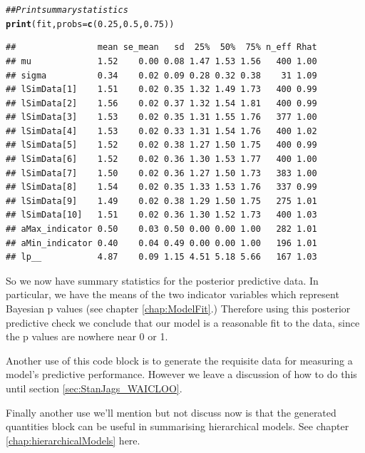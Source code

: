 \documentclass[11pt,fullpage]{book}
\makeatletter
\newenvironment{kframe}{%
	\def\at@end@of@kframe{}%
	\ifinner\ifhmode%
	\def\at@end@of@kframe{\end{minipage}}%
\begin{minipage}{\columnwidth}%
	\fi\fi%
	\def\FrameCommand##1{\hskip\@totalleftmargin \hskip-\fboxsep
		\colorbox{shadecolor}{##1}\hskip-\fboxsep
		\hskip-\linewidth \hskip-\@totalleftmargin \hskip\columnwidth}%
	\MakeFramed {\advance\hsize-\width
		\@totalleftmargin\z@ \linewidth\hsize
		\@setminipage}}%
{\par\unskip\endMakeFramed%
	\at@end@of@kframe}
\newcommand{\hlnum}[1]{\textcolor[rgb]{0.686,0.059,0.569}{#1}}%
\newcommand{\hlcom}[1]{\textcolor[rgb]{0.678,0.584,0.686}{\textit{#1}}}%
\newcommand{\hlstd}[1]{\textcolor[rgb]{0.345,0.345,0.345}{#1}}%
\newcommand{\hlkwc}[1]{\textcolor[rgb]{0.333,0.667,0.333}{#1}}%
\newcommand{\hlkwd}[1]{\textcolor[rgb]{0.737,0.353,0.396}{\textbf{#1}}}%
\newenvironment{knitrout}{}{} %
\makeatother
\begin{document}
\begin{knitrout}\small
		\color{fgcolor}\begin{kframe}
			\begin{alltt}
				\hlcom{## Print summary statistics}
				\hlkwd{print}\hlstd{(fit,}\hlkwc{probs} \hlstd{=} \hlkwd{c}\hlstd{(}\hlnum{0.25}\hlstd{,} \hlnum{0.5}\hlstd{,} \hlnum{0.75}\hlstd{))}
			\end{alltt}
			\begin{verbatim}
##                mean se_mean   sd  25%  50%  75% n_eff Rhat
## mu             1.52    0.00 0.08 1.47 1.53 1.56   400 1.00
## sigma          0.34    0.02 0.09 0.28 0.32 0.38    31 1.09
## lSimData[1]    1.51    0.02 0.35 1.32 1.49 1.73   400 0.99
## lSimData[2]    1.56    0.02 0.37 1.32 1.54 1.81   400 0.99
## lSimData[3]    1.53    0.02 0.35 1.31 1.55 1.76   377 1.00
## lSimData[4]    1.53    0.02 0.33 1.31 1.54 1.76   400 1.02
## lSimData[5]    1.52    0.02 0.38 1.27 1.50 1.75   400 0.99
## lSimData[6]    1.52    0.02 0.36 1.30 1.53 1.77   400 1.00
## lSimData[7]    1.50    0.02 0.36 1.27 1.50 1.73   383 1.00
## lSimData[8]    1.54    0.02 0.35 1.33 1.53 1.76   337 0.99
## lSimData[9]    1.49    0.02 0.38 1.29 1.50 1.75   275 1.01
## lSimData[10]   1.51    0.02 0.36 1.30 1.52 1.73   400 1.03
## aMax_indicator 0.50    0.03 0.50 0.00 0.00 1.00   282 1.01
## aMin_indicator 0.40    0.04 0.49 0.00 0.00 1.00   196 1.01
## lp__           4.87    0.09 1.15 4.51 5.18 5.66   167 1.03
			\end{verbatim}
		\end{kframe}
	\end{knitrout}

So we now have summary statistics for the posterior predictive data. In particular, we have the means of the two indicator variables which represent Bayesian p values (see chapter \ref{chap:ModelFit}.) Therefore using this posterior predictive check we conclude that our model is a reasonable fit to the data, since the p values are nowhere near 0 or 1.

Another use of this code block is to generate the requisite data for measuring a model's predictive performance. However we leave a discussion of how to do this until section \ref{sec:StanJags_WAICLOO}.

Finally another use we'll mention but not discuss now is that the generated quantities block can be useful in summarising hierarchical models. See chapter \ref{chap:hierarchicalModels} here.
\end{document}
